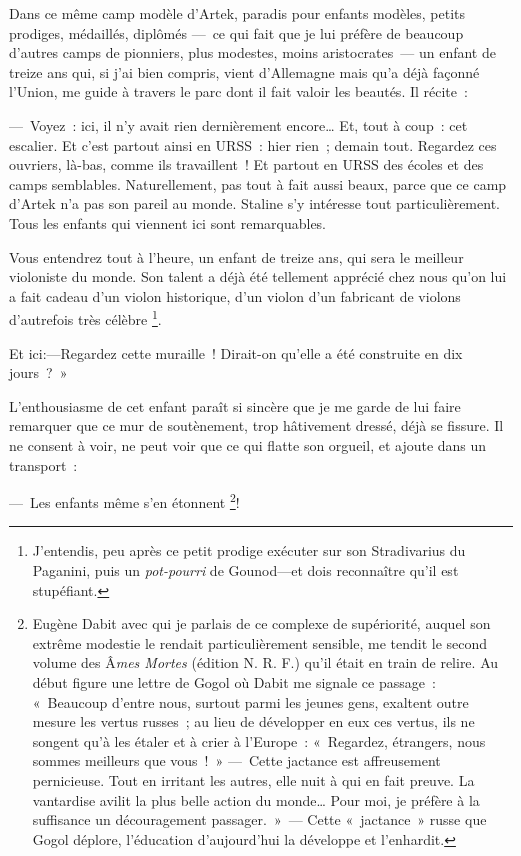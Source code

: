 \documentclass[french,twoside]{book} %
\begin{document}
Dans ce même camp modèle d’Artek, paradis pour enfants modèles, petits prodiges, médaillés, diplômés — ce qui fait que je lui préfère de beaucoup d’autres camps de pionniers, plus modestes, moins aristocrates — un enfant de treize ans qui, si j’ai bien compris, vient d’Allemagne mais qu’a déjà façonné l’Union, me guide à travers le parc dont il fait valoir les beautés. Il récite :\par
— Voyez : ici, il n’y avait rien dernièrement encore… Et, tout à coup : cet escalier. Et c’est partout ainsi en URSS : hier rien ; demain tout. Regardez ces ouvriers, là-bas, comme ils travaillent ! Et partout en URSS des écoles et des camps semblables. Naturellement, pas tout à fait aussi beaux, parce que ce camp d’Artek n’a pas son pareil au monde. Staline s’y intéresse tout particulièrement. Tous les enfants qui viennent ici sont remarquables.\par
Vous entendrez tout à l’heure, un enfant de treize ans, qui sera le meilleur violoniste du monde. Son talent a déjà été tellement apprécié chez nous qu’on lui a fait cadeau d’un violon historique, d’un violon d’un fabricant de violons d’autrefois très célèbre \footnote{J’entendis, peu après ce petit prodige exécuter sur son Stradivarius du Paganini, puis un \emph{pot-pourri} de Gounod—et dois reconnaître qu’il est stupéfiant.}.\par
Et ici:—Regardez cette muraille ! Dirait-on qu’elle a été construite en dix jours ? »\par
L’enthousiasme de cet enfant paraît si sincère que je me garde de lui faire remarquer que ce mur de soutènement, trop hâtivement dressé, déjà se fissure. Il ne consent à voir, ne peut voir que ce qui flatte son orgueil, et ajoute dans un transport :\par
— Les enfants même s’en étonnent \footnote{Eugène Dabit avec qui je parlais de ce complexe de supériorité, auquel son extrême modestie le rendait particulièrement sensible, me tendit le second volume des Â\emph{mes Mortes} (édition N. R. F.) qu’il était en train de relire. Au début figure une lettre de Gogol où Dabit me signale ce passage : « Beaucoup d’entre nous, surtout parmi les jeunes gens, exaltent outre mesure les vertus russes ; au lieu de développer en eux ces vertus, ils ne songent qu’à les étaler et à crier à l’Europe : « Regardez, étrangers, nous sommes meilleurs que vous ! » — Cette jactance est affreusement pernicieuse. Tout en irritant les autres, elle nuit à qui en fait preuve. La vantardise avilit la plus belle action du monde… Pour moi, je préfère à la suffisance un découragement passager. » — Cette « jactance » russe que Gogol déplore, l’éducation d’aujourd’hui la développe et l’enhardit.}!\par
\end{document}
